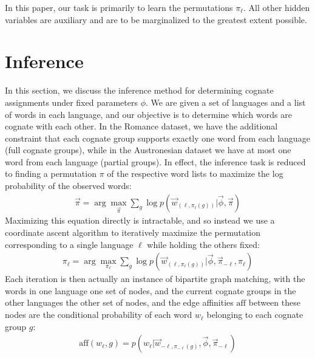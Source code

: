 \documentclass[11pt,a4paper]{article}
\begin{document}
In this paper, our task is primarily to learn the permutations
$\pi_\ell$. All other hidden variables are auxiliary and are to be
marginalized to the greatest extent possible.

\section{Inference}
In this section, we discuss the inference method for determining
cognate assignments under fixed parameters $\phi$.  We are given a
set of languages and a list of words in each language, and our
objective is to determine which words are cognate with each other.
In the Romance dataset, we have the additional constraint that each
cognate group supports exactly one word from each language (full
cognate groups), while in the Austronesian dataset we have
at most one word from each language (partial groups). In effect,
the inference task is reduced to finding a permutation $\pi$ of the
respective word lists to maximize the log probability of the observed
words:
\begin{equation}
  \begin{split}
    \vec{\pi} = \arg\!\max_{\vec \pi} \sum_{g} \log p(\vec w_{(\ell,\pi_\ell(g))}|\vec \phi,\vec \pi)
   \end{split}
 \end{equation}
Maximizing this equation directly is intractable, and so instead
we use a coordinate ascent algorithm to iteratively maximize the
permutation corresponding to a single language $\ell$ while holding
the others fixed:
\begin{equation}
  \begin{split}
    \pi_\ell = \arg\!\max_{\pi_\ell} \sum_{g} \log p(\vec w_{(\ell,\pi_\ell(g))}|\vec \phi,\vec \pi_{-\ell},\pi_\ell)
  \end{split}
\end{equation}
Each iteration is then actually an instance of bipartite graph
matching, with the words in one language one set of nodes, and the
current cognate groups in the other languages the other set of
nodes, and the edge affinities $\mathrm{aff}$ between these nodes are the conditional
probability of each word $w_\ell$ belonging to each cognate group $g$:
\begin{equation}
  \begin{split}
    \mathrm{aff}(w_\ell,g) = p(w_\ell|\vec w_{-\ell,\pi_{-\ell}(g)},\vec \phi,\vec\pi_{-\ell})
   \end{split}
 \end{equation}
\end{document}
